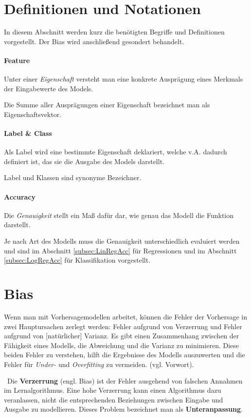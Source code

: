 
\section{Definitionen und Notationen}
\label{Sec:Definitionen}\label{Definitionen}\label{Defs}
In diesem Abschnitt werden kurz die benötigten Begriffe und Definitionen vorgestellt. Der Bias wird anschließend gesondert behandelt. 

\paragraph{Feature} Unter einer \textit{Eigenschaft} versteht man eine konkrete Ausprägung eines Merkmals der Eingabewerte des Models.  

Die Summe aller Ausprägungen einer Eigenschaft bezeichnet man als Eigenschaftsvektor.  
\paragraph{Label \& Class} Als Label wird eine bestimmte Eigenschaft deklariert, welche v.A. dadurch definiert ist, das sie die Ausgabe des Models darstellt. 

Label und Klassen sind synonyme Bezeichner.
\paragraph{Accuracy} Die \textit{Genauigkeit} stellt ein Maß dafür dar, wie genau das Modell die Funktion darstellt. 

Je nach Art des Modells muss die Genauigkeit unterschiedlich evaluiert werden und sind im Abschnitt \ref{subsec:LinRegAcc} für Regressionen und im Abschnitt \ref{subsec:LogRegAcc} für Klassifikation vorgestellt.
\section{Bias}
Wenn man mit Vorhersagemodellen arbeitet, können die Fehler der Vorhersage in zwei Hauptursachen zerlegt werden: 
Fehler aufgrund von Verzerrung und Fehler aufgrund von [natürlicher] Varianz. Es gibt einen Zusammenhang zwischen der Fähigkeit eines Modells, die Abweichung und die Varianz zu minimieren. Diese beiden Fehler zu verstehen, hilft die Ergebnisse des Modells auszuwerten und die Fehler für \textit{Under-} und \textit{Overfitting} zu vermeiden. (vgl. \cite{BiasVarianceDilemma} Vorwort).

~\newline Die \textbf{Verzerrung} (engl. Bias) ist der Fehler ausgehend von falschen Annahmen im Lernalgorithmus. Eine hohe Verzerrung kann einen Algorithmus dazu veranlassen, nicht die entsprechenden Beziehungen zwischen Eingabe und Ausgabe zu modellieren. Dieses Problem bezeichnet man als \textbf{Unteranpassung}.

